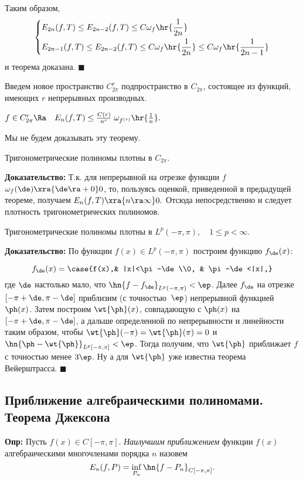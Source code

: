 \documentclass[a4paper]{article}
\begin{document}
Таким образом,
$$\left\{\begin{aligned}
&E_{2n}(f,T)\le E_{2n-2}(f,T)\le C\omega_f\hr{\frac1{2n}}\\
&E_{2n-1}(f,T)\le E_{2n-2}(f,T)\le
C\omega_f\hr{\frac1{2n}}\le
C\omega_f\hr{\frac1{2n-1}}
\end{aligned}
\right.
$$
и теорема доказана. $\blacksquare$

Введем новое пространство $C_{2\pi}^r$ подпространство в
$C_{2\pi}$, состоящее из функций, имеющих $r$ непрерывных
производных.
\begin{theorems} $f\in
C_{2\pi}^r\Ra\quad E_n(f,T)\le
\frac{C(r)}{n^r}\;\omega_{f^{(r)}}\hr{\frac1n}.$
\end{theorems}
Мы не будем доказывать эту теорему.

\begin{theorems}[Вейерштрасс] Тригонометрические полиномы плотны в
$C_{2\pi}.$
\end{theorems}
\textbf{Доказательство:} Т.к. для непрерывной на отрезке функции
$f$ $\omega_f(\de)\xra{\de\ra +0} 0$, то,
пользуясь оценкой, приведенной в предыдущей теореме, получаем
$E_n(f,T)\xra{n\ra\infty} 0.$ Отсюда
непосредственно и следует плотность тригонометрических полиномов.

\begin{theorems} Тригонометрические полиномы плотны в
$L^p(-\pi,\pi),\quad1\le p<\infty$.
\end{theorems}
\textbf{Доказательство:} По функции $f(x)\in L^p(-\pi,\pi)$
построим функцию $f_{\de}(x)$:

\begin{wrapfigure}[8]{l}{140pt}
\end{wrapfigure}

$$f_{\de}(x)=
\case{f(x),& |x|<\pi-\de\\0, & \pi-\de<|x|,}$$
где $\de$ настолько мало, что
$\hn{f-f_{\de}}_{L^p(-\pi,\pi)}<\ep$. Далее $f_{\de}$
на отрезке $[-\pi+\de,\pi-\de]$ приблизим (с
точностью~$\ep$) непрерывной функцией $\ph(x)$. Затем
построим $\wt{\ph}(x)$, совпадающую с $\ph(x)$ на
$[-\pi+\de,\pi-\de]$, а дальше определенной по непрерывности
и линейности таким образом, чтобы
$\wt{\ph}(-\pi)=\wt{\ph}(\pi)=0$ и
$\hn{\ph-\wt{\ph}}_{L^p[-\pi,\pi]}<\ep$. Тогда
получим, что $\wt{\ph}$ приближает $f$ с точностью менее
$3\ep$. Ну а для $\wt{\ph}$ уже известна теорема
Вейерштрасса. $\blacksquare$

\subsection{Приближение алгебраическими полиномами. Теорема Джексона}
\textbf{Опр:} Пусть $f(x)\in C[-\pi,\pi]$. \emph{Наилучшим
приближением} функции $f(x)$ алгебраическими многочленами порядка
$n$ назовем
$$E_n(f,P)=\inf_{P_n}\hn{f-P_n}_{C[-\pi,\pi]}.$$
\end{document}
